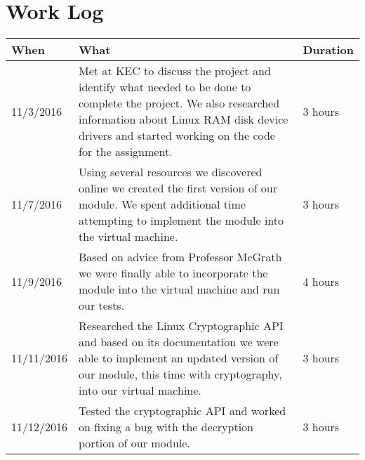 \documentclass[letterpaper,10pt,draftclsnofoot,titlepage,onecolumn]{IEEEtran}
\begin{document}
\clearpage

\section{Work Log}
\begin{center}
\begin{tabular}{ |m{2cm}|m{10cm}|m{2cm}| }
\hline
When & What & Duration \\ \hline
11/3/2016
& Met at KEC to discuss the project and identify what needed to be done to complete the project. 
We also researched information about Linux RAM disk device drivers and started working on the code for the assignment.
& 3 hours\\ 
\hline

11/7/2016 
& Using several resources we discovered online we created the first version of our module. 
We spent additional time attempting to implement the module into the virtual machine. 
& 3 hours\\ 
\hline

11/9/2016 
& Based on advice from Professor McGrath we were finally able to incorporate the module into the virtual machine and run our tests.
& 4 hours\\ 
\hline

11/11/2016 
& Researched the Linux Cryptographic API and based on its documentation we were able to implement an updated version of our module, this time with cryptography, into our virtual machine. 
& 3 hours\\ 
\hline

11/12/2016 
& Tested the cryptographic API and worked on fixing a bug with the decryption portion of our module.
& 3 hours\\
\hline

\end{tabular}
\end{center}
\end{document}
